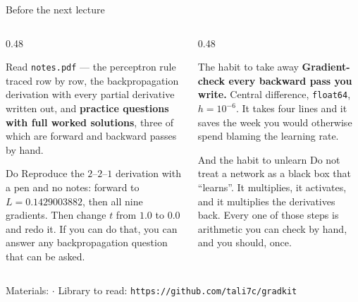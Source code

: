 \documentclass[aspectratio=169]{beamer}
\begin{document}
\begin{frame}[shrink=4]{Before the next lecture}
  \begin{columns}[T]
    \begin{column}{0.48\textwidth}
      \begin{block}{Read}
        \texttt{notes.pdf} --- the perceptron rule traced row by row, the
        backpropagation derivation with every partial derivative written out,
        and \textbf{practice questions with full worked solutions}, three of
        which are forward and backward passes by hand.
      \end{block}
      \begin{block}{Do}
        Reproduce the $2$--$2$--$1$ derivation with a pen and no notes:
        forward to $L = 0.1429003882$, then all nine gradients. Then change
        $t$ from $1.0$ to $0.0$ and redo it. If you can do that, you can
        answer any backpropagation question that can be asked.
      \end{block}
    \end{column}
    \begin{column}{0.48\textwidth}
      \begin{exampleblock}{The habit to take away}
        \textbf{Gradient-check every backward pass you write.} Central
        difference, \texttt{float64}, $h = 10^{-6}$. It takes four lines and
        it saves the week you would otherwise spend blaming the learning
        rate.
      \end{exampleblock}
      \begin{alertblock}{And the habit to unlearn}
        Do not treat a network as a black box that ``learns''. It multiplies,
        it activates, and it multiplies the derivatives back. Every one of
        those steps is arithmetic you can check by hand, and you should,
        once.
      \end{alertblock}
    \end{column}
  \end{columns}
  \begin{center}
    \small Materials: \texttt{\AMLRepoURL} \quad$\cdot$\quad
    Library to read: \texttt{https://github.com/tali7c/gradkit}
  \end{center}
  \slidesources{\AMLUnitVISources}
\end{frame}
\end{document}
